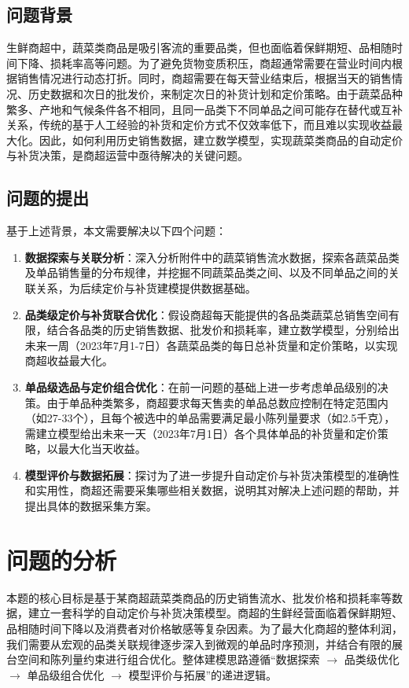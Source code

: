 \documentclass[withoutpreface]{cumcmthesis}
\begin{document}
\subsection{问题背景}
生鲜商超中，蔬菜类商品是吸引客流的重要品类，但也面临着保鲜期短、品相随时间下降、损耗率高等问题。为了避免货物变质积压，商超通常需要在营业时间内根据销售情况进行动态打折。同时，商超需要在每天营业结束后，根据当天的销售情况、历史数据和次日的批发价，来制定次日的补货计划和定价策略。由于蔬菜品种繁多、产地和气候条件各不相同，且同一品类下不同单品之间可能存在替代或互补关系，传统的基于人工经验的补货和定价方式不仅效率低下，而且难以实现收益最大化。因此，如何利用历史销售数据，建立数学模型，实现蔬菜类商品的自动定价与补货决策，是商超运营中亟待解决的关键问题。

\subsection{问题的提出}
基于上述背景，本文需要解决以下四个问题：

\begin{enumerate}
    \item \textbf{数据探索与关联分析}：深入分析附件中的蔬菜销售流水数据，探索各蔬菜品类及单品销售量的分布规律，并挖掘不同蔬菜品类之间、以及不同单品之间的关联关系，为后续定价与补货建模提供数据基础。

    \item \textbf{品类级定价与补货联合优化}：假设商超每天能提供的各品类蔬菜总销售空间有限，结合各品类的历史销售数据、批发价和损耗率，建立数学模型，分别给出未来一周（2023年7月1-7日）各蔬菜品类的每日总补货量和定价策略，以实现商超收益最大化。

    \item \textbf{单品级选品与定价组合优化}：在前一问题的基础上进一步考虑单品级别的决策。由于单品种类繁多，商超要求每天售卖的单品总数应控制在特定范围内（如27-33个），且每个被选中的单品需要满足最小陈列量要求（如2.5千克），需建立模型给出未来一天（2023年7月1日）各个具体单品的补货量和定价策略，以最大化当天收益。

    \item \textbf{模型评价与数据拓展}：探讨为了进一步提升自动定价与补货决策模型的准确性和实用性，商超还需要采集哪些相关数据，说明其对解决上述问题的帮助，并提出具体的数据采集方案。
\end{enumerate}

\section{问题的分析}
本题的核心目标是基于某商超蔬菜类商品的历史销售流水、批发价格和损耗率等数据，建立一套科学的自动定价与补货决策模型。商超的生鲜经营面临着保鲜期短、品相随时间下降以及消费者对价格敏感等复杂因素。为了最大化商超的整体利润，我们需要从宏观的品类关联规律逐步深入到微观的单品时序预测，并结合有限的展台空间和陈列量约束进行组合优化。整体建模思路遵循“数据探索 $\to$ 品类级优化 $\to$ 单品级组合优化 $\to$ 模型评价与拓展”的递进逻辑。
\end{document}
